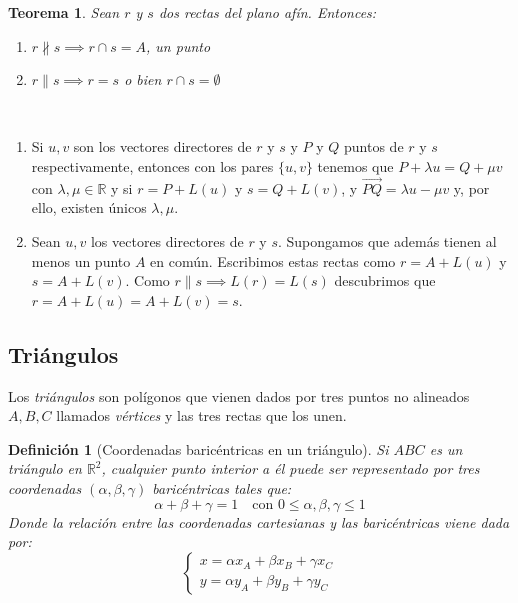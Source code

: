 \documentclass[11pt, a4paper]{article}
\makeatletter
\newif\IfInSansMode
\let\oldsf\sffamily
\renewcommand*{\sffamily}{\oldsf\mathversion{sans}\InSansModetrue}
\let\oldnorm\normalfont
\renewcommand*{\normalfont}{\oldnorm\InSansModefalse\mathversion{normal}}
\renewenvironment{proof}[1][\proofname] {\vspace{-15pt}\par\pushQED{\qed}\normalfont\topsep6\p@\@plus6\p@\relax\trivlist\item[\hskip\labelsep\it#1\@addpunct{.}]\ignorespaces}{\popQED\endtrivlist\@endpefalse}
\newcommand{\R}{\mathbb{R}}
\renewenvironment{proof}[1][\proofname] {\par\pushQED{\qed}\normalfont\topsep6\p@\@plus6\p@\relax\trivlist\item[\hskip\labelsep\itshape\sffamily#1\@addpunct{.}]\ignorespaces}{\popQED\endtrivlist\@endpefalse}
\theoremstyle{theorem-style}
\newtheorem{nth}{Teorema}[section]
\theoremstyle{definition-style}
\newtheorem{ndef}{Definición}[section]
\theoremstyle{remark-style}
\theoremstyle{example-style}
\newenvironment{nlist}
{\begin{enumerate}
    \renewcommand\labelenumi{(\emph{\roman{enumi})}}}
  {\end{enumerate}}
\makeatother
\begin{document}
\begin{nth}
  Sean $r$ y $s$ dos rectas del plano afín. Entonces:
  \begin{nlist}
  \item $r \nparallel s\implies r \cap s = A$, un punto
  \item $r \parallel s \implies r = s$ o bien $r \cap s =  \emptyset$
  \end{nlist}
\end{nth}
  \begin{proof}\hfill\\
    \begin{nlist}
    \item Si $u,v$ son los vectores directores de $r$ y $s$ y $P$ y $Q$ puntos de $r$ y $s$ respectivamente, entonces con los pares $\{u,v\}$ tenemos que $P+\lambda u = Q + \mu v$ con $\lambda, \mu \in \R$
      y si $r = P +L(u)$ y $s=Q+L(v)$, y $\overrightarrow{PQ} = \lambda u - \mu v $ y, por ello, existen únicos $\lambda, \mu$.
    \item Sean $u,v$ los vectores directores de $r$ y $s$. Supongamos que además tienen al menos un punto $A$ en común. Escribimos estas rectas como $r = A +L(u)$ y $s=A+L(v)$. Como $r \parallel s \implies L(r)=L(s)$ descubrimos que $r = A +L(u)=A+L(v) = s$.
    \end{nlist}
  \end{proof}


\subsection{Triángulos}
Los \textit{triángulos} son polígonos que vienen dados por tres puntos no alineados $A, B, C$ llamados \textit{vértices} y las tres rectas que los unen.

\begin{ndef}[Coordenadas baricéntricas en un triángulo]
	Si $ABC$ es un triángulo en $\R^2$, cualquier punto interior a él puede ser representado por tres coordenadas $(\alpha,\beta,\gamma)$ baricéntricas tales que:
	\[
	\alpha + \beta + \gamma = 1 \quad \text{con } 0\leq \alpha,\beta,\gamma \leq 1
	\]
	Donde la relación entre las coordenadas cartesianas y las baricéntricas viene dada por:
	\[
	\begin{cases}
	x = \alpha x_A + \beta x_B + \gamma x_C\\
	y = \alpha y_A + \beta y_B + \gamma y_C
\end{cases}
	\]
\end{ndef}
\end{document}
